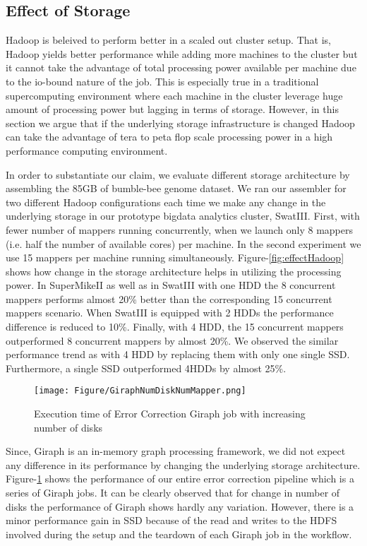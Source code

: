 \subsection {Effect of Storage}
Hadoop is beleived to perform better in a scaled out cluster setup.
That is, Hadoop yields better performance while adding more machines to the cluster but it cannot take the advantage of total processing power available per machine due to the io-bound nature of the job.
This is especially true in a traditional supercomputing environment where each machine in the cluster leverage huge amount of processing power but lagging in terms of storage.
However, in this section we argue that if the underlying storage infrastructure is changed Hadoop can take the advantage of tera to peta flop scale processing power in a high performance computing environment. 

In order to substantiate our claim, we evaluate different storage architecture by assembling the 85GB of bumble-bee genome dataset.
We ran our assembler for two different Hadoop configurations each time we make any change in the underlying storage in our prototype bigdata analytics cluster, SwatIII.
First, with fewer number of mappers running concurrently, when we launch only 8 mappers (i.e. half the number of available cores) per machine. 
In the second experiment we use 15 mappers per machine running simultaneously.
Figure-\ref{fig:effectHadoop} shows how change in the storage architecture helps in utilizing the processing power.
In SuperMikeII as well as in SwatIII with one HDD the 8 concurrent mappers performs almost 20\% better than the corresponding 15 concurrent mappers scenario.
When SwatIII is equipped with 2 HDDs the performance difference is reduced to 10\%.
Finally, with 4 HDD, the 15 concurrent mappers outperformed 8 concurrent mappers by almost 20\%.
We observed the similar performance trend as with 4 HDD by replacing them with only one single SSD.
Furthermore, a single SSD outperformed 4HDDs by almost 25\%.

\begin{figure}[h!]
\label {fig:EffectNumDiskAndMapperOnGiraph}
  \centering
      \texttt{[image: Figure/GiraphNumDiskNumMapper.png]}
  \caption{Execution time of Error Correction Giraph job with increasing number of disks}
\end{figure}
Since, Giraph is an in-memory graph processing framework, we did not expect any difference in its performance by changing the underlying storage architecture.
Figure-\ref{fig:EffectNumDiskAndMapperOnGiraph} shows the performance of our entire error correction pipeline which is a series of Giraph jobs. 
It can be clearly observed that for change in number of disks the performance of Giraph shows hardly any variation.
However, there is a minor performance gain in SSD because of the read and writes to the HDFS involved during the setup and the teardown of each Giraph job in the workflow. 

